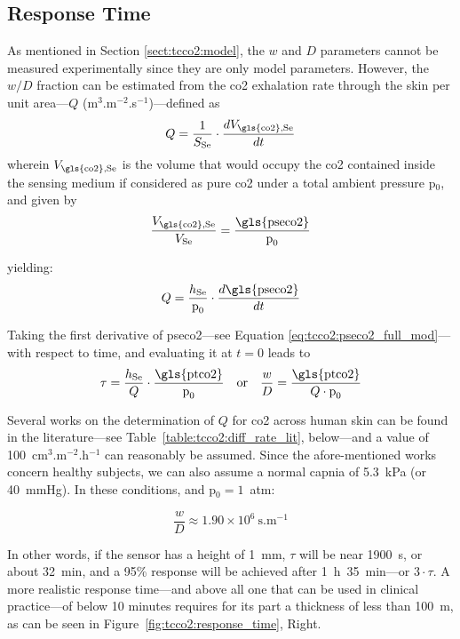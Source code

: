 \subsection{Response Time}\label{sect:tcco2:response_time}

As mentioned in Section \ref{sect:tcco2:model}, the $w$ and $D$ parameters cannot be measured experimentally since they are only model parameters. However, the $w/D$ fraction can be estimated from the \gls{co2} exhalation rate through the skin per unit area---$Q$ (m$^{3}$.m$^{-2}$.s$^{-1}$)---defined as
\begin{equation}
	Q = \frac{1}{S_\text{Se}} \cdot \frac{d V_\text{\gls{co2},Se}}{dt}
\end{equation}
wherein $V_\text{\gls{co2},Se}$ is the volume that would occupy the \gls{co2} contained inside the sensing medium if considered as pure \gls{co2} under a total ambient pressure p$_0$, and given by
\begin{equation}
	\frac{V_\text{\gls{co2},Se} }{V_\text{Se}} = \frac{\text{\gls{pseco2}}}{\text{p}_0}
\end{equation}

yielding:
\begin{equation}
	Q = \frac{h_\text{Se}}{\text{p}_0} \cdot \frac{d \text{\gls{pseco2}}}{dt}
\end{equation}

Taking the first derivative of \gls{pseco2}---see Equation \ref{eq:tcco2:pseco2_full_mod}---with respect to time, and evaluating it at $t=0$ leads to
\begin{equation}
	\tau = \frac{h_\text{Se}}{Q} \cdot \frac{\text{\gls{ptco2}}}{\text{p}_0} \quad \text{or} \quad \frac{w}{D} = \frac{\text{\gls{ptco2}}}{Q \cdot \text{p}_0}
\end{equation}

Several works on the determination of $Q$ for \gls{co2} across human skin can be found in the literature---see Table~\ref{table:tcco2:diff_rate_lit}, below---and a value of 100~cm$^3$.m$^{-2}$.h$^{-1}$ can reasonably be assumed. Since the afore-mentioned works concern healthy subjects, we can also assume a normal capnia of 5.3~kPa (or 40~mmHg)\cite{geers2000}. In these conditions, and p$_0 = 1$~atm:

\begin{equation}
	\frac{w}{D} \approx 1.90\times10^6~\text{s.m$^{-1}$}
\end{equation}

In other words, if the sensor has a height of 1~mm, $\tau$ will be near 1900~s, or about 32~min, and a 95\% response will be achieved after 1~h~35~min---or $3\cdot \tau$. A more realistic response time---and above all one that can be used in clinical practice---of below 10 minutes requires for its part a thickness of less than 100~{\textmu}m, as can be seen in Figure~\ref{fig:tcco2:response_time}, Right.

